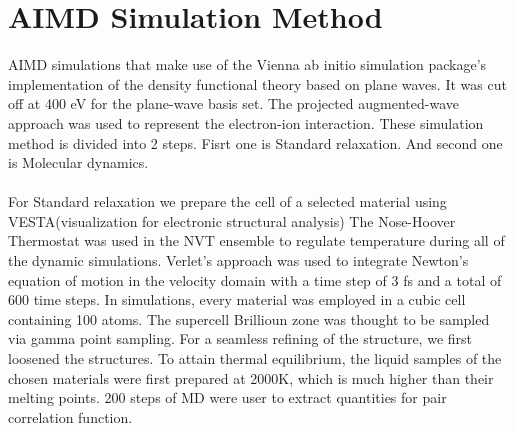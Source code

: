 \documentclass[12pt, letterpaper]{article}
\begin{document}
    \section*{AIMD Simulation Method}
    AIMD simulations that make use of the Vienna ab initio simulation package's implementation of the density functional theory based on plane waves. It was cut 
    off at 400 eV for the plane-wave basis set. The projected augmented-wave approach was used to represent the electron-ion interaction.
    These simulation method is divided into 2 steps. Fisrt one is Standard relaxation. And second one is Molecular dynamics. \\ 
     \\ 
    For Standard relaxation we prepare the cell of a selected material using VESTA(visualization for electronic structural analysis)
    The Nose-Hoover Thermostat
    was used in the NVT ensemble to regulate temperature during all of the dynamic simulations. Verlet's approach was used to integrate Newton's equation of motion 
    in the velocity domain with a time step of 3 fs and a total of 600 time steps. In simulations, every material was employed in a cubic cell containing 100 atoms. 
    The supercell Brillioun zone was thought to be sampled via gamma point sampling. For a seamless refining of the structure, we first loosened the structures. To 
    attain thermal equilibrium, the liquid samples of the chosen materials were first prepared at 2000K, which is much higher than their melting points. 200 steps of
    MD were user to extract quantities for pair correlation function.
\end{document}
